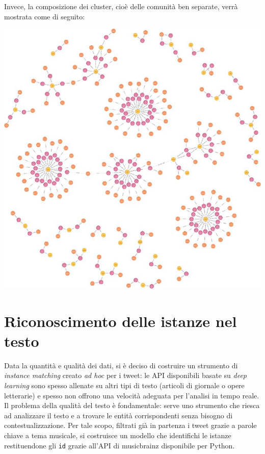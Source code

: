 \documentclass[12pt, a4paper, twocolumn]{article} %
\begin{document}
Invece, la composizione dei cluster, cioè delle comunità ben separate, verrà mostrata come di seguito:

\includegraphics[width=\linewidth]{big_graph.png}

\section{Riconoscimento delle istanze nel testo}
Data la quantità e qualità dei dati, si è deciso di costruire un strumento di \textit{instance matching} creato \textit{ad hoc} per i tweet: le API disponibili basate su \textit{deep learning} sono spesso allenate su altri tipi di testo (articoli di giornale o opere letterarie) e spesso non offrono una velocità adeguata per l'analisi in tempo reale.
Il problema della qualità del testo è fondamentale: serve uno strumento che riesca ad analizzare il testo e a trovare le entità corrispondenti senza bisogno di contestualizzazione.
Per tale scopo, filtrati già in partenza i tweet grazie a parole chiave a tema musicale, si costruisce un modello che identifichi le istanze restituendone gli \verb|id| grazie all'API di musicbrainz disponibile per Python.
\end{document}
